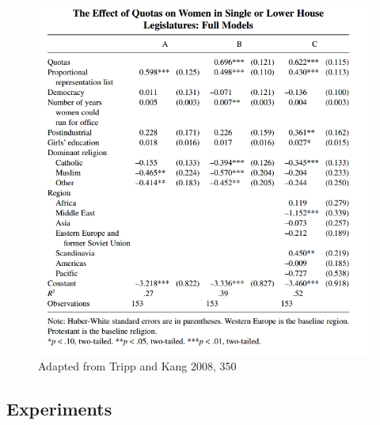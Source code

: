 \documentclass{book}
\begin{document}
\begin{figure}
\hypertarget{fig:trippkang}{%
\centering
\includegraphics{images/largen/trippkang.png}
\caption{Adapted from Tripp and Kang 2008, 350}\label{fig:trippkang}
}
\end{figure}

\hypertarget{experiments-1}{%
\subsection{Experiments}\label{experiments-1}}
\end{document}
